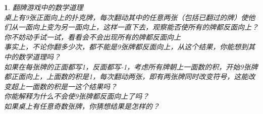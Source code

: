 \documentclass[11pt]{article}
\newtheorem{article}{ }
\begin{document}
\begin{article}
翻牌游戏中的数学道理\\
桌上有9张正面向上的扑克牌，每次翻动其中的任意两张（包括已翻过的牌）使他们从一面向上变为另一面向上，这样一直下去，观察能否使所有的牌都反面向上？\\
你不妨动手试一试，看看会不会出现所有的牌都反面向上\\
事实上，不论你翻多少次，都不能是9张牌都反面向上，从这个结果，你能想到其中的数学道理吗？\\
如果在每张牌的正面都写1，反面都写-1，考虑所有牌朝上一面数的积，开始9张牌都正面向上，上面数的积是1，每次翻动两张，即有两张牌同时改变符号，这能改变超上一面数的积是一这个结果吗？\\
你能解释为什么不会使9张牌都反面向上了吗？\\
如果桌上有任意奇数张牌，你猜想结果是怎样的？\\
\end{article}
\end{document}
